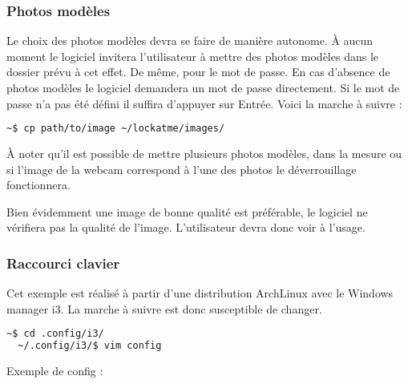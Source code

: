     \subsubsection{Photos modèles}
Le choix des photos modèles devra se faire de manière autonome. À aucun moment
le logiciel invitera l'utilisateur à mettre des photos modèles dans le dossier
prévu à cet effet. De même, pour le mot de passe. En cas d'absence de photos
modèles le logiciel demandera un mot de passe directement. Si le mot de passe
n'a pas été défini il suffira d'appuyer sur Entrée.
Voici la marche à suivre :
\begin{lstlisting}[language=bash]
  ~$ cp path/to/image ~/lockatme/images/
\end{lstlisting}
À noter qu'il est possible de mettre plusieurs photos modèles, dans la mesure
ou si l'image de la webcam correspond à l'une des photos le déverrouillage
fonctionnera.
\vspace{0.5cm}

Bien évidemment une image de bonne qualité est préférable, le logiciel ne
vérifiera pas la qualité de l'image. L'utilisateur devra donc voir à l'usage.
\newpage
    \subsubsection{Raccourci clavier}
Cet exemple est réalisé à partir d'une distribution ArchLinux avec le Windows
manager i3. La marche à suivre est donc susceptible de changer.
\begin{lstlisting}[language=bash]
  ~$ cd .config/i3/
  ~/.config/i3/$ vim config
\end{lstlisting}
Exemple de config :


